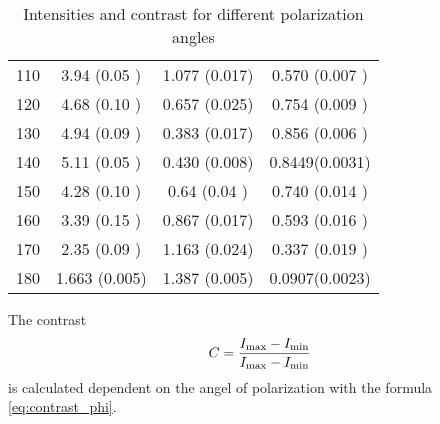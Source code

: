 \begin{table}[H]
\begin{tabular}{S[table-format=3.0] S S S[table-format=1.4(2)]}
		110                             & 3.94  (0.05 )              & 1.077 (0.017)              & 0.570 (0.007 ) \\
		120                             & 4.68  (0.10 )              & 0.657 (0.025)              & 0.754 (0.009 ) \\
		130                             & 4.94  (0.09 )              & 0.383 (0.017)              & 0.856 (0.006 ) \\
		140                             & 5.11  (0.05 )              & 0.430 (0.008)              & 0.8449(0.0031) \\
		150                             & 4.28  (0.10 )              & 0.64  (0.04 )              & 0.740 (0.014 ) \\
		160                             & 3.39  (0.15 )              & 0.867 (0.017)              & 0.593 (0.016 ) \\
		170                             & 2.35  (0.09 )              & 1.163 (0.024)              & 0.337 (0.019 ) \\
		180                             & 1.663 (0.005)              & 1.387 (0.005)              & 0.0907(0.0023) \\
		\bottomrule
	\end{tabular}
	\caption{Intensities and contrast for different polarization angles}\label{tab:contrast}
\end{table}

The contrast 
\begin{align}
	C = \frac{I_\text{max} -I_\text{min}}{I_\text{max}-I_\text{min}}
\end{align}
is calculated dependent on the angel of polarization with the formula \eqref{eq:contrast_phi}.


